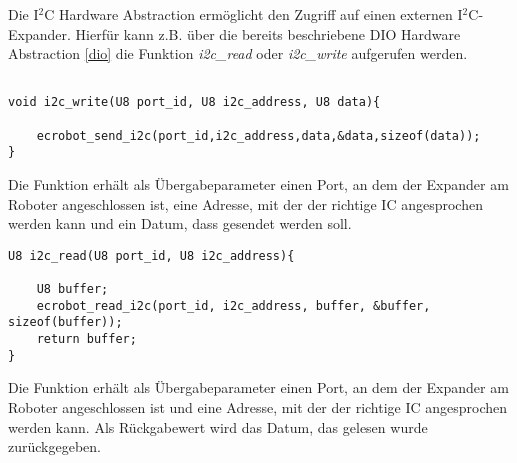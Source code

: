 Die I$^2$C Hardware Abstraction ermöglicht den Zugriff auf einen externen I$^2$C-Expander. Hierfür kann z.B. über die bereits beschriebene DIO Hardware Abstraction \ref{dio} die Funktion \textit{i2c\_read} oder \textit{i2c\_write}
aufgerufen werden.\newline\newline
\begin{lstlisting}[frame=single,caption={Aufruf der \textit{i2c\_write}-Funktion},captionpos=b]

void i2c_write(U8 port_id, U8 i2c_address, U8 data){
	
	ecrobot_send_i2c(port_id,i2c_address,data,&data,sizeof(data));
}
\end{lstlisting}\newline\newline
Die Funktion erhält als Übergabeparameter einen Port, an dem der Expander am Roboter angeschlossen ist, eine Adresse, mit der der richtige IC angesprochen werden kann und ein Datum, dass gesendet werden soll.\newline\newline
\begin{lstlisting}[frame=single,caption={Aufruf der \textit{i2c\_read}-Funktion},captionpos=b]  
U8 i2c_read(U8 port_id, U8 i2c_address){
	
	U8 buffer;
	ecrobot_read_i2c(port_id, i2c_address, buffer, &buffer, sizeof(buffer));
	return buffer;
}
\end{lstlisting}\newline\newline
Die Funktion erhält als Übergabeparameter einen Port, an dem der Expander am Roboter angeschlossen ist und eine Adresse, mit der der richtige IC angesprochen werden kann. Als Rückgabewert wird das Datum, das gelesen wurde zurückgegeben.


